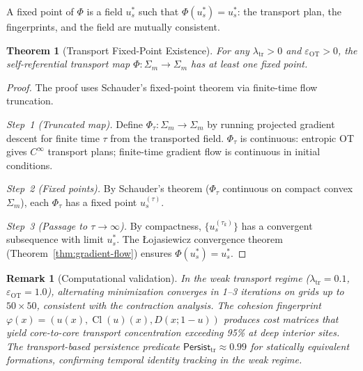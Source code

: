 \documentclass[lettersize,journal]{IEEEtran}
\newtheorem{theorem}{Theorem}
\newtheorem{remark}{Remark}
\DeclareMathOperator{\Cl}{Cl}
\begin{document}
A fixed point of $\Phi$ is a field $u_s^*$ such that $\Phi(u_s^*) = u_s^*$: the transport plan, the fingerprints, and the field are mutually consistent.

\begin{theorem}[Transport Fixed-Point Existence]
\label{thm:transport-existence}
For any $\lambda_{\mathrm{tr}} > 0$ and $\varepsilon_{\mathrm{OT}} > 0$, the self-referential transport map $\Phi : \Sigma_m \to \Sigma_m$ has at least one fixed point.
\end{theorem}

\begin{proof}
The proof uses Schauder's fixed-point theorem via finite-time flow truncation.

\emph{Step~1 (Truncated map).} Define $\Phi_\tau : \Sigma_m \to \Sigma_m$ by running projected gradient descent for finite time $\tau$ from the transported field. $\Phi_\tau$ is continuous: entropic OT gives $C^\infty$ transport plans; finite-time gradient flow is continuous in initial conditions.

\emph{Step~2 (Fixed points).} By Schauder's theorem ($\Phi_\tau$ continuous on compact convex $\Sigma_m$), each $\Phi_\tau$ has a fixed point $u_s^{(\tau)}$.

\emph{Step~3 (Passage to $\tau \to \infty$).} By compactness, $\{u_s^{(\tau_k)}\}$ has a convergent subsequence with limit $u_s^*$. The \L{}ojasiewicz convergence theorem (Theorem~\ref{thm:gradient-flow}) ensures $\Phi(u_s^*) = u_s^*$.
\end{proof}

\begin{remark}[Computational validation]
In the weak transport regime ($\lambda_{\mathrm{tr}} = 0.1$, $\varepsilon_{\mathrm{OT}} = 1.0$),
alternating minimization converges in 1--3 iterations on grids up to $50 \times 50$,
consistent with the contraction analysis. The cohesion fingerprint
$\varphi(x) = (u(x), \Cl(u)(x), D(x; 1-u))$ produces cost matrices
that yield core-to-core transport concentration exceeding 95\% at deep interior sites.
The transport-based persistence predicate $\mathsf{Persist}_{\mathrm{tr}} \approx 0.99$
for statically equivalent formations, confirming temporal identity tracking
in the weak regime.
\end{remark}
\end{document}
